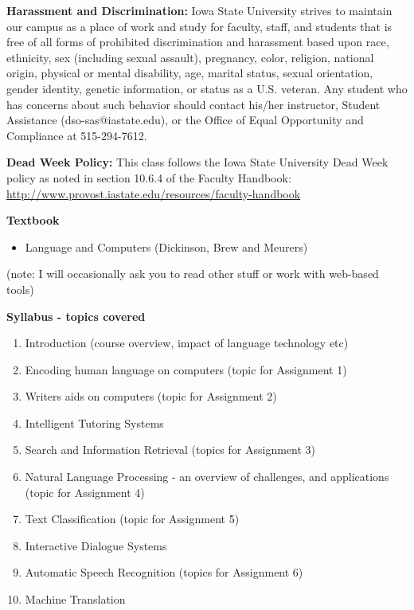 \documentclass[11pt,a4paper]{article}
\begin{document}
\bigskip\textbf{\large Harassment and Discrimination: }
Iowa State University strives to maintain our campus as a place of work and study for faculty, staff, and students that is free of all forms of prohibited discrimination and harassment based upon race, ethnicity, sex (including sexual assault), pregnancy, color, religion, national origin, physical or mental disability, age, marital status, sexual orientation, gender identity, genetic information, or status as a U.S. veteran. Any student who has concerns about such behavior should contact his/her instructor, Student Assistance (dso-sas@iastate.edu), or the Office of Equal Opportunity and Compliance at 515-294-7612.

\bigskip\textbf{\large Dead Week Policy: }
This class follows the Iowa State University Dead Week policy as noted in section 10.6.4 of the Faculty Handbook: \url{http://www.provost.iastate.edu/resources/faculty-handbook}

\bigskip\textbf{\large Textbook}
\begin{itemize}
\item Language and Computers (Dickinson, Brew and Meurers) 
\end{itemize}
(note: I will occasionally ask you to read other stuff or work with web-based tools)

\bigskip\textbf{\large Syllabus - topics covered}

\begin{enumerate}
\item Introduction (course overview, impact of language technology etc)
\item Encoding human language on computers (topic for Assignment 1)
\item Writers aids on computers (topic for Assignment 2)
\item Intelligent Tutoring Systems
\item Search and Information Retrieval (topics for Assignment 3)
\item Natural Language Processing - an overview of challenges, and applications (topic for Assignment 4)
\item Text Classification (topic for Assignment 5)
\item Interactive Dialogue Systems
\item Automatic Speech Recognition (topics for Assignment 6)
\item Machine Translation 
\end{enumerate}
\end{document}
